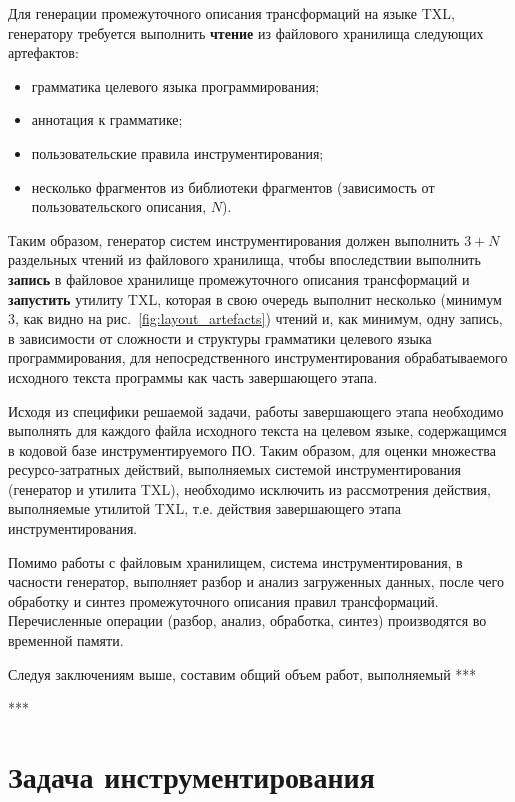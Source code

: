 Для генерации промежуточного описания трансформаций на языке TXL, генератору требуется выполнить \textbf{чтение} из файлового хранилища следующих артефактов:
\begin{itemize}[noitemsep]
  \item грамматика целевого языка программирования;
  \item аннотация к грамматике;
  \item пользовательские правила инструментирования;
  \item несколько фрагментов из библиотеки фрагментов (зависимость от пользовательского описания, $N$).
\end{itemize}

Таким образом, генератор систем инструментирования должен выполнить $3 + N$ раздельных чтений из файлового хранилища, чтобы впоследствии выполнить \textbf{запись} в файловое хранилище промежуточного описания трансформаций и \textbf{запустить} утилиту TXL, которая в свою очередь выполнит несколько (минимум $3$, как видно на рис.~\ref{fig:layout_artefacts}) чтений и, как минимум, одну запись, в зависимости от сложности и структуры грамматики целевого языка программирования, для непосредственного инструментирования обрабатываемого исходного текста программы как часть завершающего этапа.

Исходя из специфики решаемой задачи, работы завершающего этапа необходимо выполнять для каждого файла исходного текста на целевом языке, содержащимся в кодовой базе инструментируемого ПО.
Таким образом, для оценки множества ресурсо-затратных действий, выполняемых системой инструментирования (генератор и утилита TXL), необходимо исключить из рассмотрения действия, выполняемые утилитой TXL, т.е. действия завершающего этапа инструментирования.

Помимо работы с файловым хранилищем, система инструментирования, в часности генератор, выполняет разбор и анализ загруженных данных, после чего обработку и синтез промежуточного описания правил трансформаций.
Перечисленные операции (разбор, анализ, обработка, синтез) производятся во временной памяти.

Следуя заключениям выше, составим общий объем работ, выполняемый ***

***

\section{Задача инструментирования}

